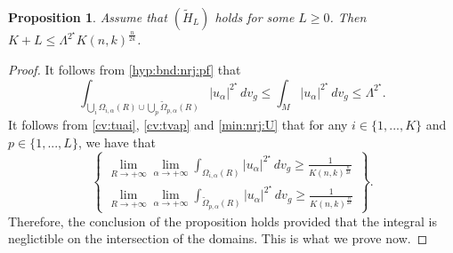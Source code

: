 \documentclass[reqno]{amsart}
\newtheorem{proposition}{Proposition}[section]
\def \crit {2^\star}
\def \ua {u_\alpha}
\begin{document}
\begin{proposition}\label{prop:4.4} Assume that $(\tilde{H}_L)$ holds for some $L\geq 0$. Then $K+L\leq \Lambda^{\crit} K(n,k)^{\frac{n}{2k}}$.
\end{proposition}
\begin{proof} It follows from \eqref{hyp:bnd:nrj:pf} that
\begin{equation}\label{eq:36}
\int_{\bigcup_i\Omega_{i,\alpha}(R)\cup \bigcup_p\tilde{\Omega}_{p,\alpha}(R) }|\ua|^{\crit}\, dv_g\leq \int_M |\ua|^{\crit}\, dv_g\leq\Lambda^{\crit}.
\end{equation}
It follows from \eqref{cv:tuai}, \eqref{cv:tvap} and \eqref{min:nrj:U} that for any $i\in\{1,...,K\}$ and $p\in\{1,...,L\}$, we have that
\begin{equation}
\left\{\begin{array}{c}
\lim_{R\to +\infty}\lim_{\alpha\to +\infty}\int_{\Omega_{i,\alpha}(R) }|\ua|^{\crit}\, dv_g\geq \frac{1}{K(n,k)^{\frac{n}{2k}}}\\
\lim_{R\to +\infty}\lim_{\alpha\to +\infty}\int_{\tilde{\Omega}_{p,\alpha}(R)}|\ua|^{\crit}\, dv_g\geq \frac{1}{K(n,k)^{\frac{n}{2k}}}\end{array}\right\}.\label{eq:37}
\end{equation}
Therefore, the conclusion of the proposition holds provided  that the integral is neglictible on the intersection of the domains. This is what we prove now.


\end{proof}
\end{document}
